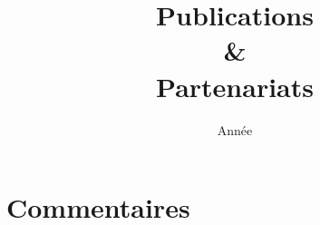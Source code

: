 \documentclass[french,11pt]{dibiso/pubpart}
\title{Publications \\ \& \\ Partenariats}
\subtitle{\tuttiReportTitle}
\date{Année \tuttiCfgYear}
\date{}
\begin{document}
\maketitle

\clearpage
\section*{Commentaires}
\end{document}

